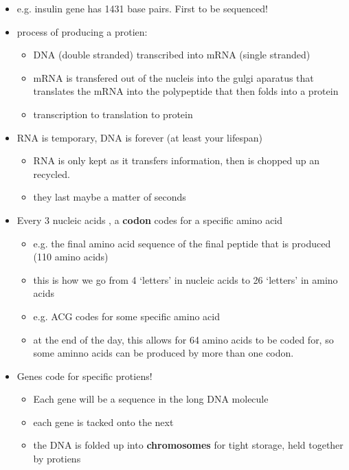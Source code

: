\documentclass{article}
\theoremstyle{definition}
\begin{document}
\begin{itemize}
	\item e.g. insulin gene has 1431 base pairs. First to be sequenced!
	\item process of producing a protien:
		\begin{itemize}
			\item DNA (double stranded) transcribed into mRNA (single stranded)
			\item mRNA is transfered out of the nucleis into the gulgi aparatus that translates the mRNA into the polypeptide that then folds into a protein
			\item transcription to translation to protein
		\end{itemize}
	\item RNA is temporary, DNA is forever (at least your lifespan)
		\begin{itemize}
			\item RNA is only kept as it transfers information, then is chopped up an recycled.
			\item they last maybe a matter of seconds
		\end{itemize}
	\item Every 3 nucleic acids , a \textbf{codon}  codes for a specific amino acid
		\begin{itemize}
			\item e.g. the final amino acid sequence of the final peptide that is produced (110 amino acids)
			\item this is how we go from 4 `letters' in nucleic acids to 26 `letters' in amino acids
			\item e.g. ACG codes for some specific amino acid
			\item at the end of the day, this allows for 64 amino acids to be coded for, so some aminno acids can be produced by more than one codon.
		\end{itemize}
	\item Genes code for specific protiens!
		\begin{itemize}
			\item Each gene will be a sequence in the long DNA molecule
			\item each gene is tacked onto the next
			\item the DNA is folded up into \textbf{chromosomes} for tight storage, held together by protiens 
		\end{itemize}
\end{itemize}
\end{document}
